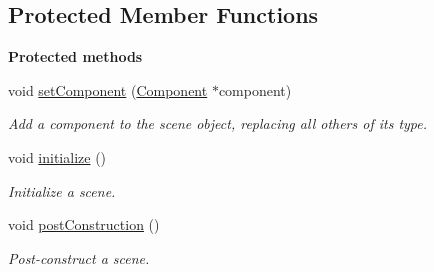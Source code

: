 \subsection*{Protected Member Functions}
\begin{Indent}\textbf{ Protected methods}\par
\begin{DoxyCompactItemize}
\item 
\mbox{\label{classrev_1_1_scene_ac7d6271d06920fc9497d224566260f19}} 
void \mbox{\hyperlink{classrev_1_1_scene_ac7d6271d06920fc9497d224566260f19}{set\+Component}} (\mbox{\hyperlink{classrev_1_1_component}{Component}} $\ast$component)
\begin{DoxyCompactList}\small\item\em Add a component to the scene object, replacing all others of it\textquotesingle{}s type. \end{DoxyCompactList}\item 
\mbox{\label{classrev_1_1_scene_a53231c87311406b05ad40e6c9e30847d}} 
void \mbox{\hyperlink{classrev_1_1_scene_a53231c87311406b05ad40e6c9e30847d}{initialize}} ()
\begin{DoxyCompactList}\small\item\em Initialize a scene. \end{DoxyCompactList}\item 
\mbox{\label{classrev_1_1_scene_a93085773a86bdcb6c0aceca59e812d6f}} 
void \mbox{\hyperlink{classrev_1_1_scene_a93085773a86bdcb6c0aceca59e812d6f}{post\+Construction}} ()
\begin{DoxyCompactList}\small\item\em Post-\/construct a scene. \end{DoxyCompactList}\end{DoxyCompactItemize}
\end{Indent}
